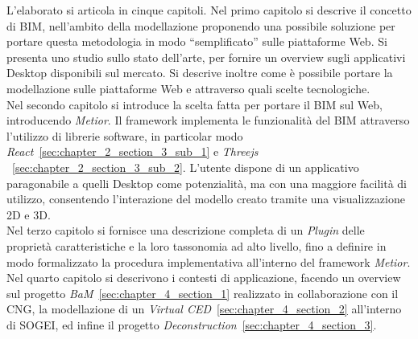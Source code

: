 L'elaborato si articola in cinque capitoli.
Nel primo capitolo si descrive il concetto di BIM, nell’ambito della modellazione proponendo una possibile soluzione
per portare questa metodologia in modo ``semplificato'' sulle piattaforme Web.
Si presenta uno studio sullo stato dell’arte, per fornire un overview
sugli applicativi Desktop disponibili sul mercato. Si descrive inoltre come è
possibile portare la modellazione sulle piattaforme Web e attraverso quali scelte tecnologiche.\\
Nel secondo capitolo si introduce la scelta fatta per portare il BIM sul Web, introducendo \emph{Metior}.
Il framework implementa le funzionalità del BIM attraverso l'utilizzo di librerie software,
in particolar modo \emph{React}~\ref{sec:chapter_2_section_3_sub_1} e \emph{Threejs} ~\ref{sec:chapter_2_section_3_sub_2}.
L'utente dispone di un applicativo paragonabile a quelli
Desktop come potenzialità, ma con una maggiore facilità di utilizzo, consentendo l'interazione del modello creato
tramite una visualizzazione 2D e 3D.\\
Nel terzo capitolo si fornisce una descrizione completa di un \emph{Plugin} delle
proprietà caratteristiche e la loro tassonomia ad alto livello, fino a definire in modo formalizzato
la procedura implementativa all'interno del framework \emph{Metior}.\\
Nel quarto capitolo si descrivono i contesti di applicazione, facendo un overview sul
progetto \emph{BaM}~\ref{sec:chapter_4_section_1} realizzato in collaborazione con il CNG,
la modellazione di un \emph{Virtual CED}~\ref{sec:chapter_4_section_2} all'interno di SOGEI, ed
infine il progetto \emph{Deconstruction}~\ref{sec:chapter_4_section_3}.

